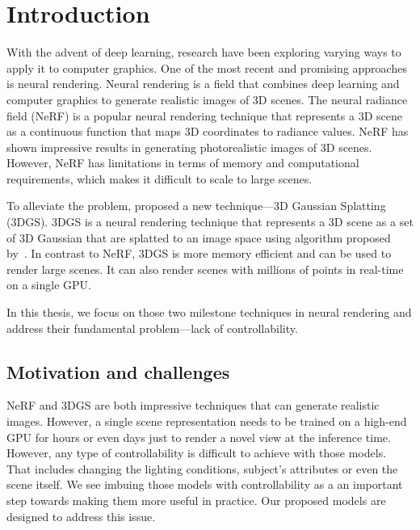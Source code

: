 \chapter{Introduction}
\label{chap:introduction}

With the advent of deep learning, research have been exploring varying ways to
apply it to computer graphics.
One of the most recent and promising approaches is neural rendering.
Neural rendering is a field that combines deep learning and computer graphics
to generate realistic images of 3D scenes.
The neural radiance field (NeRF) is a popular neural rendering technique that
represents a 3D scene as a continuous function that maps 3D coordinates to
radiance values.
NeRF has shown impressive results in generating photorealistic images of 3D
scenes.
However, NeRF has limitations in terms of memory and computational
requirements, which makes it difficult to scale to large scenes.

To alleviate the problem, \textcite{kerbl20233d} proposed a new technique---3D
Gaussian Splatting (3DGS).
3DGS is a neural rendering technique that represents a 3D scene as a set of 3D Gaussian that are splatted to an image space using algorithm proposed by~\textcite{zwicker2001ewa}.
In contrast to NeRF, 3DGS is more memory efficient and can be used to render
large scenes.
It can also render scenes with millions of points in real-time on a single
GPU.

In this thesis, we focus on those two milestone techniques in neural rendering
and address their fundamental problem---lack of controllability.

\section{Motivation and challenges}

  NeRF and 3DGS are both impressive techniques that can generate realistic
  images.
  However, a single scene representation needs to be trained on a high-end GPU
  for hours or even days just to render a novel view at the inference time.
  However, any type of controllability is difficult to achieve with those
  models.
  That includes changing the lighting conditions, subject's attributes or even
  the scene itself.
  We see imbuing those models with controllability as a an important step
  towards making them more useful in practice.
  Our proposed models are designed to address this issue.

